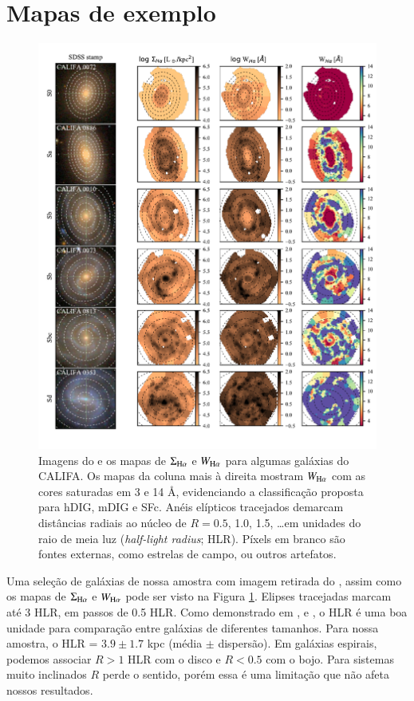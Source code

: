 \section{Mapas de exemplo}
\label{sec:sample:maps}
\begin{figure}
\includegraphics[scale=0.9]{figuras/fig_maps_class_faceon_paper.pdf}
 \caption[Imagem \SDSS e mapas de $\Sigma_{{\rm H}\alpha}$ e $W_{{\rm H}\alpha}$]
 {Imagens do \SDSS e os mapas de $\Sigma_{\Ha}$ e $W_{\Ha}$ para algumas galáxias do CALIFA. Os mapas da coluna mais à direita mostram $W_{\Ha}$ com as cores saturadas em 3 e 14 \AA, evidenciando a classificação proposta para hDIG, mDIG e SFc. Anéis elípticos tracejados demarcam distâncias radiais ao núcleo de $R = 0.5$, 1.0, 1.5, \dots em unidades do raio de meia luz ({\em half-light radius}; HLR). Píxels em branco são fontes externas, como estrelas de campo, ou outros artefatos.}
 \label{fig:ExampleMaps}
\end{figure}

Uma seleção de galáxias de nossa amostra com imagem retirada do \SDSS, assim como os mapas de $\Sigma_{\Ha}$ e $W_{\Ha}$ pode ser visto na Figura \ref{fig:ExampleMaps}. Elipses tracejadas marcam até 3 HLR, em passos de 0.5 HLR. Como demonstrado em \citet{Perez.etal.2013}, \citet{Sanchez.etal.2014} e \citet{GonzalezDelgado.etal.2016a}, o HLR é uma boa unidade para comparação entre galáxias de diferentes tamanhos. Para nossa amostra, o HLR = $3.9 \pm 1.7$ kpc (média $\pm$ dispersão). Em galáxias espirais, podemos associar $R > 1$ HLR com o disco e $R < 0.5$ com o bojo. Para sistemas muito inclinados $R$ perde o sentido, porém essa é uma limitação que não afeta nossos resultados.

